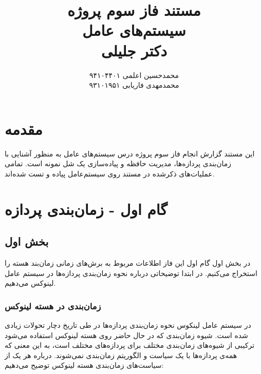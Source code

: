 \documentclass{article}
\title{
مستند فاز سوم پروژه
\\
\vspace{4mm}
سیستم‌های عامل
\\
\vspace{2mm}
دکتر جلیلی
}
\author{
محمدحسین اعلمی
\hspace{1cm}
۹۴۱۰۴۴۰۱
\\
محمدمهدی فاریابی
\hspace{1cm}
۹۳۱۰۱۹۵۱
}
\date{}
\begin{document}
\maketitle

\section*{مقدمه}

این مستند گزارش انجام فاز سوم پروژه درس سیستم‌های عامل به منظور آشنایی با زمان‌بندی پردازه‌ها، مدیریت حافظه و پیاده‌سازی یک شل نمونه است. تمامی عملیات‌های ذکر‌شده در مستند روی سیستم‌عامل
پیاده و تست‌ شده‌اند.

\section{گام اول - زمان‌بندی پردازه}

\subsection{بخش اول}

در بخش اول گام اول این فاز اطلاعات مربوط به برش‌های زمانی زمان‌بند هسته را استخراج می‌کنیم. در ابتدا توضیحاتی درباره نحوه زمان‌بندی پردازه‌ها در سیستم عامل لینوکس می‌دهیم.

\subsubsection{زمان‌بندی در هسته لینوکس\cite{1}\cite{2}}

در سیستم عامل لینکوس نحوه زمان‌بندی پردازه‌ها در طی تاریخ دچار تحولات زیادی شده است. شیوه زمان‌بندی که در حال حاضر روی هسته لینوکس استفاده می‌شود ترکیبی از شیوه‌های زمان‌بندی مختلف برای پردازه‌های مختلف است، به این معنی که همه‌ی پردازه‌ها با یک سیاست و الگوریتم زمان‌بندی نمی‌شوند. درباره هر یک از سیاست‌های زمان‌بندی هسته لینوکس توضیح می‌دهیم:
\end{document}
